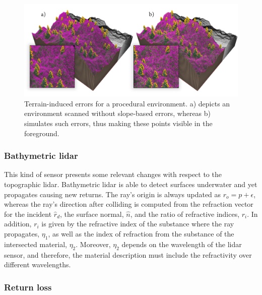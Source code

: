 \begin{figure}
    \centering
    \includegraphics[width=\linewidth]{figs/lidar_simulation/terrain_induced_errors.png}
	\caption{Terrain-induced errors for a procedural environment. a) depicts an environment scanned without slope-based errors, whereas b) simulates such errors, thus making these points visible in the foreground. }
	\label{fig:terrain_induced_errors}
\end{figure}

\subsubsection{Bathymetric \acrshort{lidar}}

This kind of sensor presents some relevant changes with respect to the topographic \acrshort{lidar}. Bathymetric \acrshort{lidar} is able to detect surfaces underwater and yet propagates causing new returns. The ray's origin is always updated as $r_{o} = p + \epsilon$, whereas the ray's direction after colliding is computed from the refraction vector for the incident $\hat{r}_{d}$, the surface normal, $\hat{n}$, and the ratio of refractive indices, $r_{i}$. In addition, $r_{i}$ is given by the refractive index of the substance where the ray propagates, $\eta_{1}$, as well as the index of refraction from the substance of the intersected material, $\eta_{2}$. Moreover, $\eta_{2}$ depends on the wavelength of the \acrshort{lidar} sensor, and therefore, the material description must include the refractivity over different wavelengths.

\subsubsection{Return loss}

